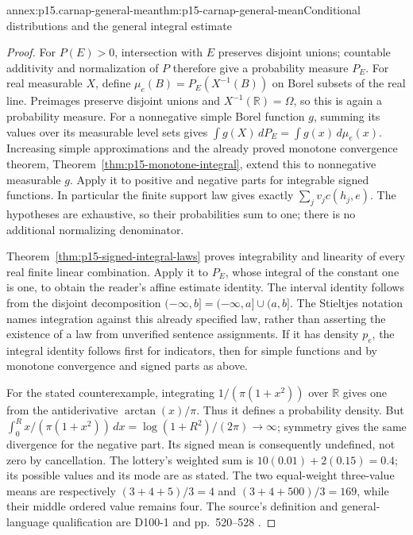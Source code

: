 \begin{annexitem}{annex:p15.carnap-general-mean}{thm:p15-carnap-general-mean}{Conditional distributions and the general integral estimate}
\begin{proof}
For \(P(E)>0\), intersection with \(E\) preserves disjoint unions;
countable additivity and normalization of \(P\) therefore give a
probability measure \(P_E\). For real measurable \(X\), define
\(\mu_e(B)=P_E(X^{-1}(B))\) on Borel subsets of the real line.
Preimages preserve disjoint unions and \(X^{-1}(\mathbb R)=\Omega\),
so this is again a probability measure.
For a nonnegative simple Borel function \(g\), summing its values
over its measurable level sets gives
\(\int g(X)\,dP_E=\int g(x)\,d\mu_e(x)\).
Increasing simple approximations and the already proved monotone
convergence theorem, Theorem~\ref{thm:p15-monotone-integral}, extend
this to nonnegative measurable \(g\). Apply it to positive and
negative parts for integrable signed functions. In particular the
finite support law gives exactly \(\sum_j v_jc(h_j,e)\).
The hypotheses are exhaustive, so their probabilities sum to one;
there is no additional normalizing denominator.

Theorem~\ref{thm:p15-signed-integral-laws} proves integrability and
linearity of every real finite linear combination. Apply it to
\(P_E\), whose integral of the constant one is one, to obtain the
reader's affine estimate identity. The interval identity follows from
the disjoint decomposition \(({-\infty},b]=({-\infty},a]\cup(a,b]\).
The Stieltjes notation names integration against this already specified
law, rather than asserting the existence of a law from unverified
sentence assignments. If it has density \(p_e\), the integral
identity follows first for indicators, then for simple functions and
by monotone convergence and signed parts as above.

For the stated counterexample, integrating
\(1/(\pi(1+x^2))\) over \(\mathbb R\) gives one from the
antiderivative \(\arctan(x)/\pi\). Thus it defines a probability
density. But
\(\int_0^R x/(\pi(1+x^2))\,dx=
\log(1+R^2)/(2\pi)\to\infty\); symmetry gives the same
divergence for the negative part. Its signed mean is consequently
undefined, not zero by cancellation. The lottery's weighted sum is
\(10(0.01)+2(0.15)=0.4\); its possible values and its mode are
as stated. The two equal-weight three-value means are respectively
\((3+4+5)/3=4\) and \((3+4+500)/3=169\), while their middle
ordered value remains four. The source's definition and general-language
qualification are D100-1 and pp.~520--528 \cite{Carnap1950Probability}.
\end{proof}
\end{annexitem}

